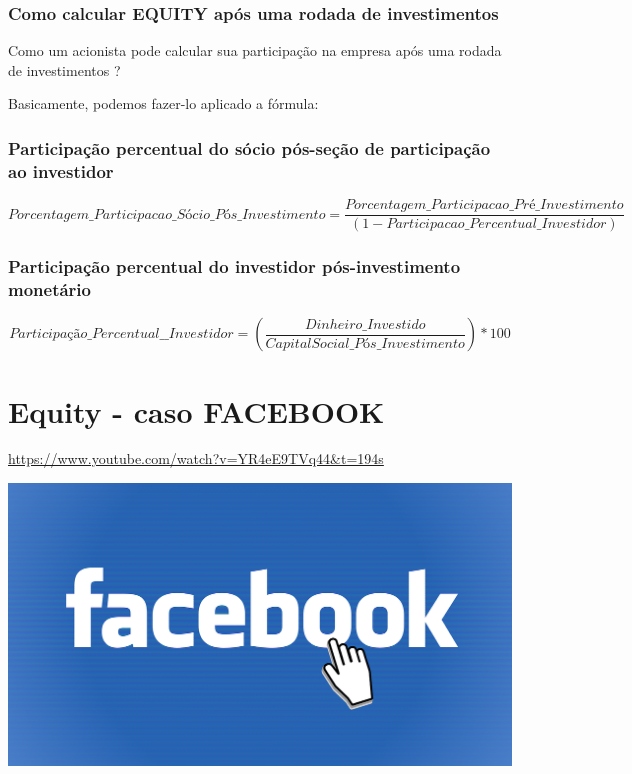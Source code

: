 \documentclass[
]{book}
\begin{document}
\subsubsection{Como calcular EQUITY após uma rodada de investimentos}\label{como-calcular-equity-apuxf3s-uma-rodada-de-investimentos}

Como um acionista pode calcular sua participação na empresa após uma rodada de investimentos ?

Basicamente, podemos fazer-lo aplicado a fórmula:

\subsubsection{Participação percentual do sócio pós-seção de participação ao investidor}\label{participauxe7uxe3o-percentual-do-suxf3cio-puxf3s-seuxe7uxe3o-de-participauxe7uxe3o-ao-investidor}

\[
Porcentagem\_Participacao\_Sócio\_Pós\_Investimento = \frac{Porcentagem\_Participacao\_Pré\_Investimento}{(1 - Participacao\_Percentual\_Investidor)}
\]

\subsubsection{Participação percentual do investidor pós-investimento monetário}\label{participauxe7uxe3o-percentual-do-investidor-puxf3s-investimento-monetuxe1rio}

\[
Participação\_Percentual\_\_Investidor = (\frac{ Dinheiro\_Investido}{ CapitalSocial\_Pós\_Investimento}) * 100%
\]

\section{Equity - caso FACEBOOK}\label{equity---caso-facebook}

\url{https://www.youtube.com/watch?v=YR4eE9TVq44&t=194s}

\includegraphics[width=7.04167in,height=\textheight]{images/03-2025-08-19_20/05-facebook.png}
\end{document}
